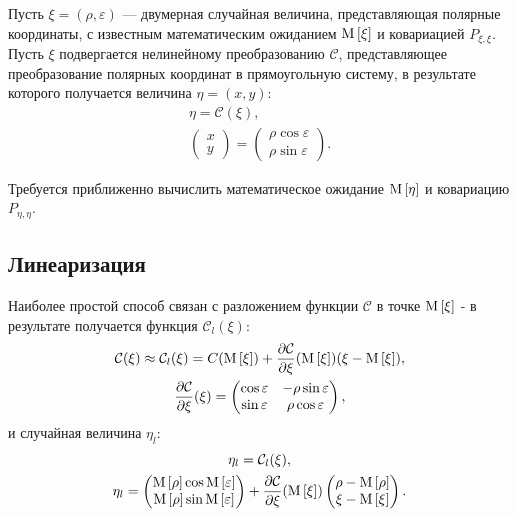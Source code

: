 Пусть $\xi = (\rho, \varepsilon)$ --- двумерная случайная величина, представляющая полярные координаты, с известным математическим ожиданием $\mathrm{M} \left [ \xi \right ]$ и ковариацией
$P_{\xi,\xi}$. Пусть $\xi$ подвергается нелинейному преобразованию $\mathcal{C}$, представляющее преобразование полярных координат в прямоугольную систему, в результате которого
получается величина $\eta = (x, y)$:
\begin{gather*}
    \eta = \mathcal{C}(\xi), \\
    \begin{pmatrix}
        x \\
        y
    \end{pmatrix}
    =
    \begin{pmatrix}
        \rho \cos \varepsilon \\
        \rho \sin \varepsilon
    \end{pmatrix}.
\end{gather*}

Требуется приближенно вычислить математическое ожидание $\mathrm{M} \left [ \eta \right ]$ и ковариацию $P_{\eta,\eta}$.

\subsection{Линеаризация}

Наиболее простой способ связан с разложением функции $\mathcal{C}$ в точке $\mathrm{M} \left [ \xi \right ]$ - в результате получается
функция $\mathcal{C}_l(\xi)$:
\begin{gather*}
    \mathcal{C}(\xi) \approx \mathcal{C}_l(\xi) = C(\mathrm{M} \left [ \xi \right ]) + \frac{\partial \mathcal{C}}{\partial \xi}(\mathrm{M} \left [ \xi \right ]) ( \xi - \mathrm{M} \left [ \xi \right ]) , \\
    \frac{\partial \mathcal{C}}{\partial \xi}(\xi) =
        \begin{pmatrix}
            \cos \varepsilon & - \rho \sin \varepsilon \\
            \sin \varepsilon & \rho \cos \varepsilon
        \end{pmatrix} ,
\end{gather*}
и случайная величина $\eta_l$:
\begin{gather*}
    \eta_l = \mathcal{C}_l(\xi), \\
    \eta_l =
        \begin{pmatrix}
            \mathrm{M} \left [ \rho \right ] \cos \mathrm{M} \left [ \varepsilon \right ] \\
            \mathrm{M} \left [ \rho \right ] \sin \mathrm{M} \left [ \varepsilon \right ]
        \end{pmatrix}
        +
        \frac{\partial \mathcal{C}}{\partial \xi}(\mathrm{M} \left [ \xi \right ])
        \begin{pmatrix}
            \rho - \mathrm{M} \left [ \rho \right ] \\
            \xi - \mathrm{M} \left [ \xi \right ]
        \end{pmatrix}
    .
\end{gather*}

